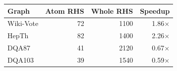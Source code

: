 \begin{tabular}{lrrr}\toprule
Graph & Atom RHS & Whole RHS & Speedup \\
\midrule
Wiki-Vote & 72 & 1100 & 1.86$\times$ \\
HepTh & 82 & 1400 & 2.26$\times$ \\
DQA87 & 41 & 2120 & 0.67$\times$ \\
DQA103 & 39 & 1540 & 0.59$\times$ \\
\bottomrule\end{tabular}
